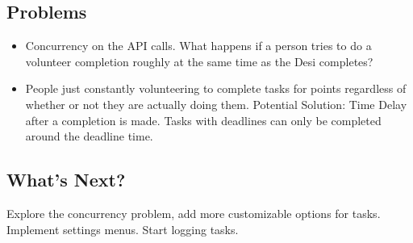 \documentclass[11pt, a4paper]{report}
\begin{document}
\subsection{Problems}
\begin{itemize}
\item Concurrency on the API calls. What happens if a person tries to do a volunteer completion roughly at the same time as the Desi completes?
\item People just constantly volunteering to complete tasks for points regardless of whether or not they are actually doing them. Potential Solution: Time Delay after a completion is made. Tasks with deadlines can only be completed around the deadline time.
\end{itemize}
\subsection{What's Next?}
Explore the concurrency problem, add more customizable options for tasks. Implement settings menus. Start logging tasks.
\end{document}
